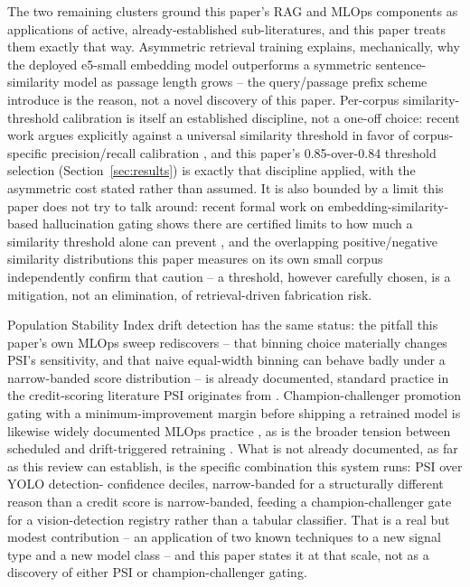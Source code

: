 The two remaining clusters ground this paper's RAG and MLOps components as applications of
active, already-established sub-literatures, and this paper treats them exactly that way.
Asymmetric retrieval training explains, mechanically, why the deployed e5-small embedding model
outperforms a symmetric sentence-similarity model as passage length grows -- the query/passage
prefix scheme \citet{wang2022e5} introduce is the reason, not a novel discovery of this paper.
Per-corpus similarity-threshold calibration is itself an established discipline, not a one-off
choice: recent work argues explicitly against a universal similarity threshold in favor of
corpus-specific precision/recall calibration \citep{researchgate2025ragprecision,
braintrust2025ragmetrics}, and this paper's 0.85-over-0.84 threshold selection
(Section~\ref{sec:results}) is exactly that discipline applied, with the asymmetric cost stated
rather than assumed. It is also bounded by a limit this paper does not try to talk around: recent
formal work on embedding-similarity-based hallucination gating shows there are certified limits to
how much a similarity threshold alone can prevent \citep{arxiv2026semanticillusion,
arxiv2025haltrag}, and the overlapping positive/negative similarity distributions this paper
measures on its own small corpus independently confirm that caution -- a threshold, however
carefully chosen, is a mitigation, not an elimination, of retrieval-driven fabrication risk.

Population Stability Index drift detection has the same status: the pitfall this paper's own
MLOps sweep rediscovers -- that binning choice materially changes PSI's sensitivity, and that
naive equal-width binning can behave badly under a narrow-banded score distribution -- is already
documented, standard practice in the credit-scoring literature PSI originates from
\citep{arize2026psi,arize2026binning,fiddler2026psi,yurdakul2018psi}. Champion-challenger
promotion gating with a minimum-improvement margin before shipping a retrained model is likewise
widely documented MLOps practice \citep{datarobot2026champion,snowflake2026champion}, as is the
broader tension between scheduled and drift-triggered retraining
\citep{wwt2026mlopsdrift,researchgate2025autodrift}. What is not already documented, as far as this
review can establish, is the specific combination this system runs: PSI over YOLO detection-
confidence deciles, narrow-banded for a structurally different reason than a credit score is
narrow-banded, feeding a champion-challenger gate for a vision-detection registry rather than a
tabular classifier. That is a real but modest contribution -- an application of two known
techniques to a new signal type and a new model class -- and this paper states it at that scale,
not as a discovery of either PSI or champion-challenger gating.

